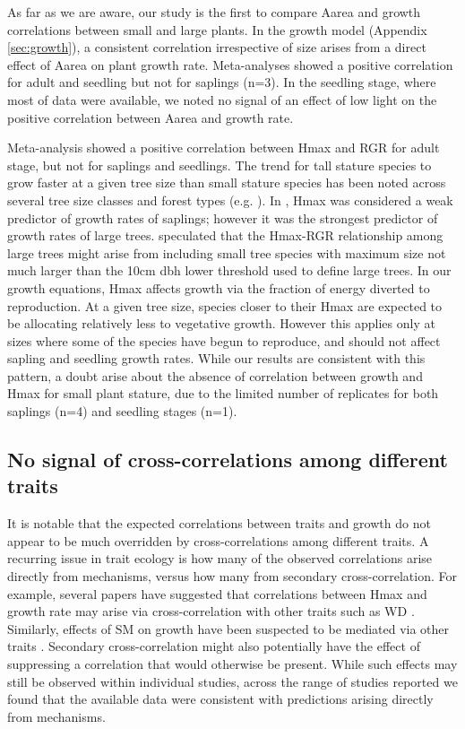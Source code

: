 \documentclass[a4paper,11pt]{article}
\begin{document}
As far as we are aware, our study is the first to compare Aarea and growth correlations between small and large plants. In the growth model (Appendix \ref{sec:growth}), a consistent correlation irrespective of size arises from a direct effect of Aarea on plant growth rate. Meta-analyses showed a positive correlation for adult and seedling but not for saplings (n=3). In the seedling stage, where most of data were available, we noted no signal of an effect of low light on the positive correlation between Aarea and growth rate. 

Meta-analysis showed a positive correlation between Hmax and RGR for adult stage, but not for saplings and seedlings. The trend for tall stature species to grow faster at a given tree size than small stature species has been noted across several tree size classes and forest types (e.g. \citealt{Thomas:1996do,Poorter:2008iu,Wright:2010tp,Herault:2011dd,Ruger:2012jv,Iida:2014ep}). In \citet{Wright:2010tp}, Hmax was considered a weak predictor of growth rates of saplings; however it was the strongest predictor of growth rates of large trees. \citet{Poorter:2008iu} speculated that the Hmax-RGR relationship among large trees might arise from including small tree species with maximum size not much larger than the 10cm dbh lower threshold used to define large trees. In our growth equations, Hmax affects growth via the fraction of energy diverted to reproduction. At a given tree size, species closer to their Hmax are expected to be allocating relatively less to vegetative growth. However this applies only at sizes where some of the species have begun to reproduce, and should not affect sapling and seedling growth rates. While our results are consistent with this pattern, a doubt arise about the absence of correlation between growth and Hmax for small plant stature, due to the limited number of replicates for both saplings (n=4) and seedling stages (n=1). 

\subsection*{No signal of cross-correlations among different traits}

It is notable that the expected correlations between traits and growth do not appear to be much overridden by cross-correlations among different traits. A recurring issue in trait ecology is how many of the observed correlations arise directly from mechanisms, versus how many from secondary cross-correlation. For example, several papers have suggested that correlations between Hmax and growth rate may arise via cross-correlation with other traits such as WD \citep{Thomas:1996do, Poorter:2006vb, Wright:2010tp}. Similarly, effects of SM on growth have been suspected to be mediated via other traits \citep{Shipley:1990js,Westoby:2002ft,Poorter:2006vb}. Secondary cross-correlation might also potentially have the effect of suppressing a correlation that would otherwise be present. While such effects may still be observed within individual studies, across the range of studies reported we found that the available data were consistent with predictions arising directly from mechanisms.
\end{document}
